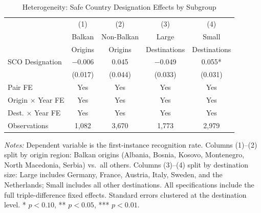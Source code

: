 \begin{table}[H]
\centering
\caption{Heterogeneity: Safe Country Designation Effects by Subgroup}
\begin{threeparttable}
\begin{tabular}{lcccc}
\toprule
 & (1) & (2) & (3) & (4) \\
 & Balkan & Non-Balkan & Large & Small \\
 & Origins & Origins & Destinations & Destinations \\
\midrule
SCO Designation & $-$0.006 & 0.045 & $-$0.049 & 0.055* \\
 & (0.017) & (0.044) & (0.033) & (0.031) \\[0.5em]
\midrule
Pair FE & Yes & Yes & Yes & Yes \\
Origin $\times$ Year FE & Yes & Yes & Yes & Yes \\
Dest. $\times$ Year FE & Yes & Yes & Yes & Yes \\[0.3em]
Observations & 1,082 & 3,670 & 1,773 & 2,979 \\
\bottomrule
\end{tabular}
\begin{tablenotes}[flushleft]
\small
\item \textit{Notes:} Dependent variable is the first-instance recognition rate. Columns (1)--(2) split by origin region: Balkan origins (Albania, Bosnia, Kosovo, Montenegro, North Macedonia, Serbia) vs.\ all others. Columns (3)--(4) split by destination size: Large includes Germany, France, Austria, Italy, Sweden, and the Netherlands; Small includes all other destinations. All specifications include the full triple-difference fixed effects. Standard errors clustered at the destination level. * $p<0.10$, ** $p<0.05$, *** $p<0.01$.
\end{tablenotes}
\end{threeparttable}
\label{tab:hetero}
\end{table}
